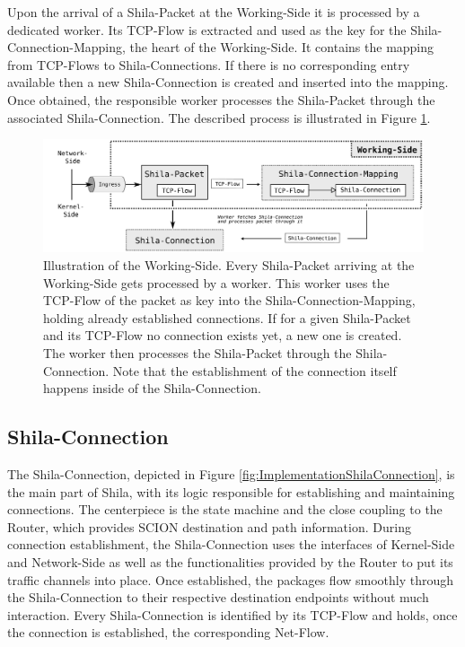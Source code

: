 Upon the arrival of a Shila-Packet at the Working-Side it is processed by a dedicated worker. Its TCP-Flow is extracted and used as the key for the Shila-Connection-Mapping, the heart of the Working-Side. It contains the mapping from TCP-Flows to Shila-Connections. If there is no corresponding entry available then a new Shila-Connection is created and inserted into the mapping. Once obtained, the responsible worker processes the Shila-Packet through the associated Shila-Connection. The described process is illustrated in Figure \ref{fig:ImplementationProcessWorkingSide}. 

\begin{figure}
	\begin{center}
		\def\svgwidth{1\textwidth}
		\includegraphics[scale=0.2]{../illustrations/implementation/ProcessWorkingSide.pdf}   
		\caption[]{Illustration of the Working-Side. Every Shila-Packet arriving at the Working-Side gets processed by a worker. This worker uses the TCP-Flow of the packet as key into the Shila-Connection-Mapping, holding already established connections. If for a given Shila-Packet and its TCP-Flow no connection exists yet, a new one is created. The worker then processes the Shila-Packet through the Shila-Connection. Note that the establishment of the connection itself happens inside of the Shila-Connection.}
		\label{fig:ImplementationProcessWorkingSide}
	\end{center}
\end{figure}

\subsection*{Shila-Connection}

The Shila-Connection, depicted in Figure \ref{fig:ImplementationShilaConnection}, is the main part of Shila, with its logic responsible for establishing and maintaining connections. The centerpiece is the state machine and the close coupling to the Router, which provides SCION destination and path information. During connection establishment, the Shila-Connection uses the interfaces of Kernel-Side and Network-Side as well as the functionalities provided by the Router to put its traffic channels into place. Once established, the packages flow smoothly through the Shila-Connection to their respective destination endpoints without much interaction. Every Shila-Connection is identified by its TCP-Flow and holds, once the connection is established, the corresponding Net-Flow.

